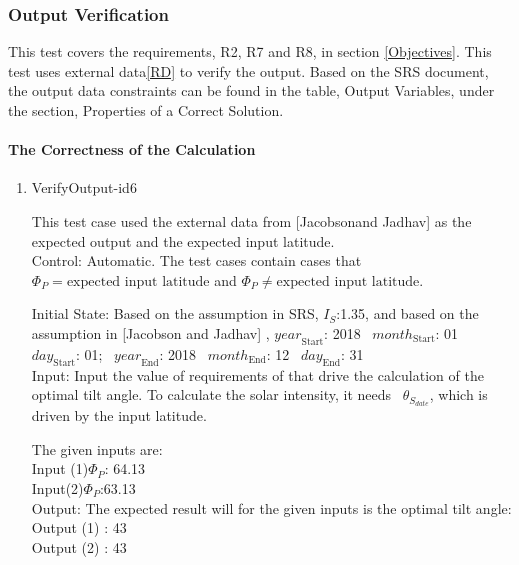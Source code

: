 \documentclass[12pt, titlepage]{article}
\begin{document}
\subsubsection{Output Verification}\label{STD_VO} 

This test covers the requirements, R2, R7 and R8, in section \ref{Objectives}. This
test
uses external data\ref{RD} to verify the output. Based on the SRS 
document\cite{YS2019}, the output data constraints can be found in the
table, Output Variables, under the section, Properties of a Correct Solution. 

\paragraph{The Correctness of the Calculation}
\begin{enumerate}




\item{VerifyOutput-id6\\} 

This test case used the external data from [Jacobsonand
Jadhav] \cite{JacobsonandJadhav} as the expected output and the expected
input latitude.\\ 

Control: Automatic. The test cases contain cases that $\Phi_P
= \text{expected input latitude}$ and $\Phi_P \ne \text{expected input
latitude}$. 

Initial State: Based on the assumption in SRS\cite{YS2019}, $I_{S}$:1.35, and
based on the assumption in [Jacobson and Jadhav] \cite{JacobsonandJadhav},
$\mathit{year}_\text{Start}$: 2018
~$\mathit{month}_\text{Start}$: 01 
~$\mathit{day}_\text{Start}$: 01;
~$\mathit{year}_\text{End}$: 2018 
~$\mathit{month}_\text{End}$: 12
~$\mathit{day}_\text{End}$: 31\\ 

Input: Input the value of requirements of
\progname that drive the calculation of the optimal tilt angle. To calculate
the solar intensity, it needs ~$\theta_{S_{date}}$, which is driven by the input latitude.

The given inputs are:\\
Input (1)$\Phi_P$: 64.13 \\ 
Input(2)$\Phi_P$:63.13\\

Output: The expected result will for the given inputs is the optimal tilt
angle:\\ Output (1) : 43\\ Output (2) : 43\\


\end{enumerate}
\end{document}
